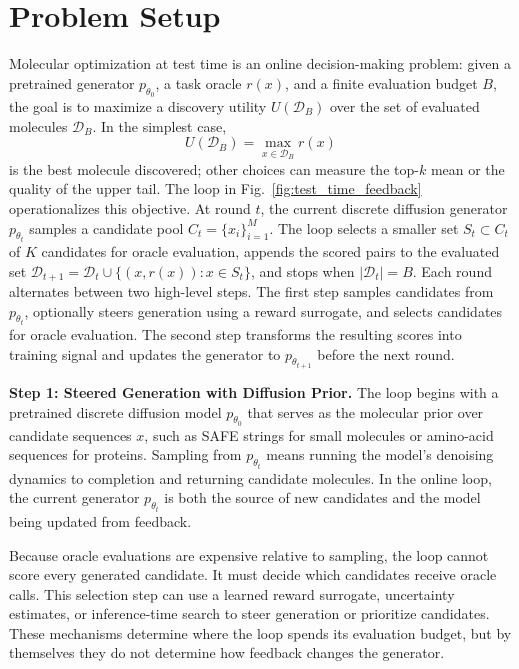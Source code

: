 \section{Problem Setup}
\label{sec:problem-setup}


Molecular optimization at test time is an online decision-making problem: given a pretrained generator $p_{\theta_0}$, a task oracle $r(x)$, and a finite evaluation budget $B$, the goal is to maximize a discovery utility $U(\mathcal{D}_B)$ over the set of evaluated molecules $\mathcal{D}_B$. In the simplest case, $$U(\mathcal{D}_B)=\max_{x\in\mathcal{D}_B} r(x)$$
is the best molecule discovered; other choices can measure the top-$k$ mean or the quality of the upper tail. The loop in Fig.~\ref{fig:test_time_feedback} operationalizes this objective. At round $t$, the current discrete diffusion generator $p_{\theta_t}$ samples a candidate pool $C_t=\{x_i\}_{i=1}^M$. The loop selects a smaller set $S_t\subset C_t$ of $K$ candidates for oracle evaluation, appends the scored pairs to the evaluated set $\mathcal{D}_{t+1}=\mathcal{D}_t\cup\{(x,r(x)):x\in S_t\}$, and stops when $|\mathcal{D}_t|=B$.
Each round alternates between two high-level steps.  The first step samples candidates from $p_{\theta_t}$, optionally steers generation using a reward surrogate, and selects candidates for oracle evaluation. The second step transforms the resulting scores into training signal and updates the generator to $p_{\theta_{t+1}}$ before the next round. %

\textbf{Step 1: Steered Generation with Diffusion Prior.}
The loop begins with a pretrained discrete diffusion model $p_{\theta_0}$ that serves as the molecular prior over candidate sequences $x$, such as SAFE strings for small molecules or amino-acid sequences for proteins. Sampling from $p_{\theta_t}$ means running the model's denoising dynamics to completion and returning candidate molecules. In the online loop, the current generator $p_{\theta_t}$ is both the source of new candidates and the model being updated from feedback.

Because oracle evaluations are expensive relative to sampling, the loop cannot score every generated candidate. It must decide which candidates receive oracle calls. This selection step can use a learned reward surrogate, uncertainty estimates, or inference-time search to steer generation or prioritize candidates. These mechanisms determine where the loop spends its evaluation budget, but by themselves they do not determine how feedback changes the generator.

